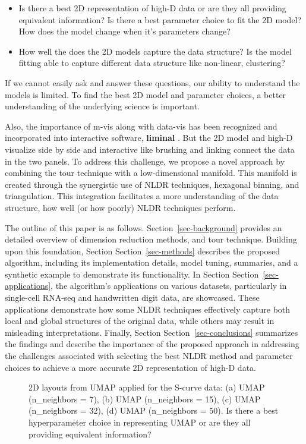\documentclass[
  12pt]{article}
\begin{document}
\begin{itemize}
\item
  Is there a best 2D representation of high-D data or are they all
  providing equivalent information? Is there a best parameter choice to
  fit the 2D model? How does the model change when it's parameters
  change?
\item
  How well the does the 2D models capture the data structure? Is the
  model fitting able to capture different data structure like
  non-linear, clustering?
\end{itemize}

If we cannot easily ask and answer these questions, our ability to
understand the models is limited. To find the best 2D model and
parameter choices, a better understanding of the underlying science is
important.

Also, the importance of m-vis along with data-vis has been recognized
and incorporated into interactive software, \textbf{liminal}
\citep{article21}. But the 2D model and high-D visualize side by side
and interactive like brushing and linking connect the data in the two
panels. To address this challenge, we propose a novel approach by
combining the tour technique with a low-dimensional manifold. This
manifold is created through the synergistic use of NLDR techniques,
hexagonal binning, and triangulation. This integration facilitates a
more understanding of the data structure, how well (or how poorly) NLDR
techniques perform.

The outline of this paper is as follows. Section~\ref{sec-background}
provides an detailed overview of dimension reduction methods, and tour
technique. Building upon this foundation, Section
Section~\ref{sec-methods} describes the proposed algorithm, including
its implementation details, model tuning, summaries, and a synthetic
example to demonstrate its functionality. In Section
Section~\ref{sec-applications}, the algorithm's applications on various
datasets, particularly in single-cell RNA-seq and handwritten digit
data, are showcased. These applications demonstrate how some NLDR
techniques effectively capture both local and global structures of the
original data, while others may result in misleading interpretations.
Finally, Section Section~\ref{sec-conclusions} summarizes the findings
and describe the importance of the proposed approach in addressing the
challenges associated with selecting the best NLDR method and parameter
choices to achieve a more accurate 2D representation of high-D data.

\begin{figure}


\caption{\label{fig-nldervisUMAP}2D layouts from UMAP applied for the
S-curve data: (a) UMAP (n\_neighbors = 7), (b) UMAP (n\_neighbors = 15),
(c) UMAP (n\_neighbors = 32), (d) UMAP (n\_neighbors = 50). Is there a
best hyperparameter choice in representing UMAP or are they all
providing equivalent information?}

\end{figure}%
\end{document}
